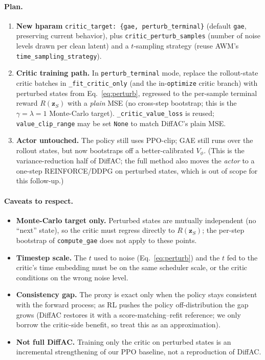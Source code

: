 \documentclass[11pt]{article}
\theoremstyle{plain}
\theoremstyle{remark}
\newcommand{\zt}{\bm{z}}
\begin{document}
\paragraph{Plan.}
\begin{enumerate}[leftmargin=1.6em]
  \item \textbf{New hparam} \texttt{critic\_target: \{gae, perturb\_terminal\}} (default
  \texttt{gae}, preserving current behavior), plus \texttt{critic\_perturb\_samples}
  (number of noise levels drawn per clean latent) and a $t$-sampling strategy (reuse
  AWM's \texttt{time\_sampling\_strategy}).
  \item \textbf{Critic training path.} In \texttt{perturb\_terminal} mode, replace the
  rollout-state critic batches in \texttt{\_fit\_critic\_only} (and the in-\texttt{optimize}
  critic branch) with perturbed states from Eq.~\eqref{eq:perturb}, regressed to the
  per-sample terminal reward $R(\zt_S)$ with a \emph{plain} MSE (no cross-step bootstrap;
  this is the $\gamma{=}\lambda{=}1$ Monte-Carlo target). \texttt{\_critic\_value\_loss}
  is reused; \texttt{value\_clip\_range} may be set \texttt{None} to match DiffAC's plain
  MSE.
  \item \textbf{Actor untouched.} The policy still uses PPO-clip; GAE still runs over the
  rollout states, but now bootstraps off a better-calibrated $V_\phi$. (This is the
  variance-reduction half of DiffAC; the full method also moves the \emph{actor} to a
  one-step REINFORCE/DDPG on perturbed states, which is out of scope for this follow-up.)
\end{enumerate}

\paragraph{Caveats to respect.}
\begin{itemize}[leftmargin=1.6em]
  \item \textbf{Monte-Carlo target only.} Perturbed states are mutually independent
  (no ``next'' state), so the critic must regress directly to $R(\zt_S)$; the per-step
  bootstrap of \texttt{compute\_gae} does not apply to these points.
  \item \textbf{Timestep scale.} The $t$ used to noise (Eq.~\eqref{eq:perturb}) and the
  $t$ fed to the critic's time embedding must be on the same scheduler scale, or the
  critic conditions on the wrong noise level.
  \item \textbf{Consistency gap.} The proxy is exact only when the policy stays
  consistent with the forward process; as RL pushes the policy off-distribution the gap
  grows (DiffAC restores it with a score-matching--refit reference; we only borrow the
  critic-side benefit, so treat this as an approximation).
  \item \textbf{Not full DiffAC.} Training only the critic on perturbed states is an
  incremental strengthening of our PPO baseline, not a reproduction of DiffAC.
\end{itemize}
\end{document}
